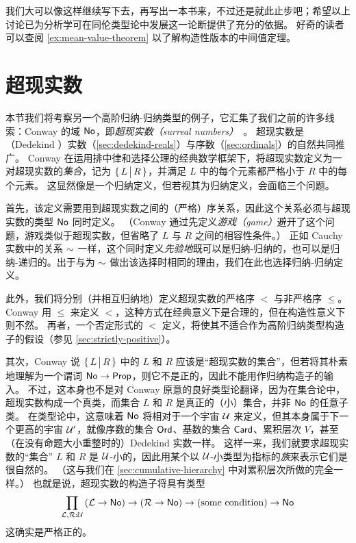 我们大可以像这样继续写下去，再写出一本书来，不过还是就此止步吧；希望以上讨论已为分析学可在同伦类型论中发展这一论断提供了充分的依据。
好奇的读者可以查阅 \cref{ex:mean-value-theorem} 以了解构造性版本的中间值定理。


%
%

\section{超现实数}
\label{sec:surreals}

%

本节我们将考察另一个高阶归纳-归纳类型的例子，它汇集了我们之前的许多线索：Conway 的域 $\mathsf{No}$，即\emph{超现实数（surreal numbers）}~\cite{conway:onag}。
超现实数是（Dedekind ）实数（\cref{sec:dedekind-reals}）与序数（\cref{sec:ordinals}）的自然共同推广。
Conway 在运用排中律和选择公理的经典数学框架下，将超现实数定义为一对超现实数的\emph{集合}，记为 $\{\,L\,\big|\,R\,\}$，并满足 $L$ 中的每个元素都严格小于 $R$ 中的每个元素。
这显然像是一个归纳定义，但若视其为归纳定义，会面临三个问题。

首先，该定义需要用到超现实数之间的（严格）序关系，因此这个关系必须与超现实数的类型 $\mathsf{No}$ 同时定义。
（Conway 通过先定义\emph{游戏（game）}避开了这个问题，游戏类似于超现实数，但省略了 $L$ 与 $R$ 之间的相容性条件。）
正如 Cauchy 实数中的关系 $\mathord\sim$ 一样，这个同时定义\emph{先验地}既可以是归纳-归纳的，也可以是归纳-递归的。出于与为 $\mathord\sim$ 做出该选择时相同的理由，我们在此也选择归纳-归纳定义。

此外，我们将分别（并相互归纳地）定义超现实数的严格序 $<$ 与非严格序 $\le$。
Conway 用 $\le$ 来定义 $<$，这种方式在经典意义下是合理的，但在构造性意义下则不然。
%
再者，一个否定形式的 $<$ 定义，将使其不适合作为高阶归纳类型构造子的假设（参见 \cref{sec:strictly-positive}）。

其次，Conway 说 $\{\,L\,\big|\,R\,\}$ 中的 $L$ 和 $R$ 应该是“超现实数的集合”，但若将其朴素地理解为一个谓词 $\mathsf{No}\to\mathsf{Prop}$，则它不是正的，因此不能用作归纳构造子的输入。
不过，这本身也不是对 Conway 原意的良好类型论翻译，因为在集合论中，超现实数构成一个真类，而集合 $L$ 和 $R$ 是真正的（小）集合，并非 $\mathsf{No}$ 的任意子类。
在类型论中，这意味着 $\mathsf{No}$ 将相对于一个宇宙 $\mathcal{U}$ 来定义，但其本身属于下一个更高的宇宙 $\mathcal{U}'$，就像序数的集合 $\mathsf{Ord}$、基数的集合 $\mathsf{Card}$、累积层次 $V$，甚至（在没有命题大小重整时的）Dedekind 实数一样。
%
这样一来，我们就要求超现实数的“集合” $L$ 和 $R$ 是 $\mathcal{U}$-小的，因此用某个以 $\mathcal{U}$-小类型为指标的\emph{族}来表示它们是很自然的。
（这与我们在 \cref{sec:cumulative-hierarchy} 中对累积层次所做的完全一样。）
也就是说，超现实数的构造子将具有类型
\[ \prd{\LL,\RR:\UU} (\LL\to\NO) \to (\RR\to \NO) \to (\text{some condition}) \to \NO \]
这确实是严格正的。

